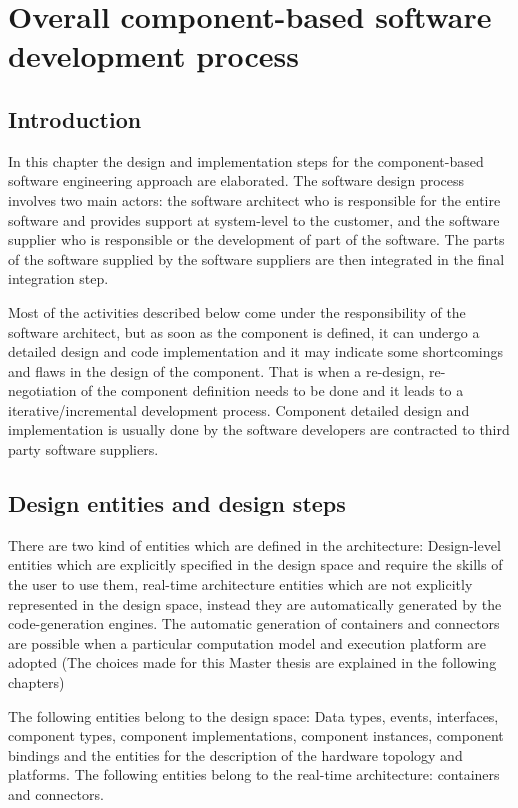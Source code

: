 
\chapter{Overall component-based software development process}
\label{chap: Software development process}
\section{Introduction}
In this chapter the design and implementation steps for the component-based software engineering approach are elaborated. The software design process involves two main actors: the software architect who is responsible for the entire software and provides support at system-level to the customer, and the software supplier who is responsible or the development of part of the software. The parts of the software supplied by the software suppliers are then integrated in the final integration step.

Most of the activities described below come under the responsibility of the software architect, but as soon as the component is defined, it can undergo a detailed design and code implementation and it may indicate some shortcomings and flaws in the design of the component. That is when a re-design, re-negotiation of the component definition needs to be done and it leads to a iterative/incremental development process. Component detailed design and implementation is usually done by the software developers are contracted to third party software suppliers.

\section{Design entities and design steps}
There are two kind of entities which are defined in the architecture: Design-level entities which are explicitly specified in the design space and require the skills of the user to use them, real-time architecture entities which are not explicitly represented in the design space, instead they are automatically generated by the code-generation engines. The automatic generation of containers and connectors are possible when a particular computation model and execution platform are adopted (The choices made for this Master thesis are explained in the following chapters)  

The following entities belong to the design space: Data types, events, interfaces, component types, component implementations, component instances, component bindings and the entities for the description of the hardware topology and platforms. The following entities belong to the real-time architecture: containers and connectors.

